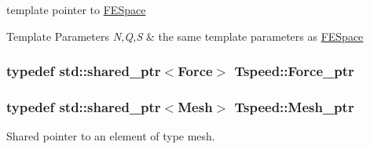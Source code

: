 template pointer to \hyperlink{classTspeed_1_1FESpace}{F\-E\-Space} 


\begin{DoxyTemplParams}{Template Parameters}
{\em N,Q,S} & the same template parameters as \hyperlink{classTspeed_1_1FESpace}{F\-E\-Space} \\
\hline
\end{DoxyTemplParams}
\hypertarget{namespaceTspeed_a3795c740b127fc84de9d80cc919dd4d1}{
\subsubsection[{Force\-\_\-ptr}]{\setlength{\rightskip}{0pt plus 5cm}typedef std\-::shared\-\_\-ptr$<${\bf Force}$>$ {\bf Tspeed\-::\-Force\-\_\-ptr}}}\label{namespaceTspeed_a3795c740b127fc84de9d80cc919dd4d1}
\hypertarget{namespaceTspeed_a7367a01365c4cc2c1a09305b3effc4e8}{
\subsubsection[{Mesh\-\_\-ptr}]{\setlength{\rightskip}{0pt plus 5cm}typedef std\-::shared\-\_\-ptr$<${\bf Mesh}$>$ {\bf Tspeed\-::\-Mesh\-\_\-ptr}}}\label{namespaceTspeed_a7367a01365c4cc2c1a09305b3effc4e8}


Shared pointer to an element of type mesh. 



